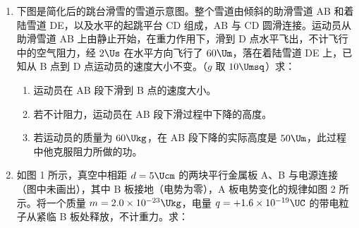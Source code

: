\documentclass[\gkver]{gaokaozhenti}
\begin{document}
\begin{enumerate}
{③当灯泡两端的电压为 0 时，灯泡的功率也为零，故 B、D 错误；由 $P = \frac{U^{2}}{R}$ 可在图象中选取几个特殊点，分别计算在不同电压下灯泡的功率，定性地作出 $P-U$ 图象，可得图象 A 正确。
}

\item
下图是简化后的跳台滑雪的雪道示意图。整个雪道由倾斜的助滑雪道 AB 和着陆雪道 DE，以及水平的起跳平台 CD 组成，AB 与 CD 圆滑连接。运动员从助滑雪道 AB 上由静止开始，在重力作用下，滑到 D 点水平飞出，不计飞行中的空气阻力，经 $2\Us$ 在水平方向飞行了 $60\Um$，落在着陆雪道 DE 上，已知从 B 点到 D 点运动员的速度大小不变。（$g$ 取 $10\Umsq$）求：

\begin{enumerate}
	\item
	运动员在 AB 段下滑到 B 点的速度大小。
	\item
	若不计阻力，运动员在 AB 段下滑过程中下降的高度。
	\item
	若运动员的质量为 $60\Ukg$，在 AB 段下降的实际高度是 $50\Um$，此过程中他克服阻力所做的功。
\end{enumerate}


\item
如图 1 所示，真空中相距 $d = 5\Ucm$ 的两块平行金属板 A、B 与电源连接（图中未画出），其中 B 板接地（电势为零），A 板电势变化的规律如图 2 所示。将一个质量 $m = 2.0\times10^{-23}\Ukg$，电量 $q = +1.6\times10^{-19}\UC$ 的带电粒子从紧临 B 板处释放，不计重力。求：


\end{enumerate}
\end{document}
